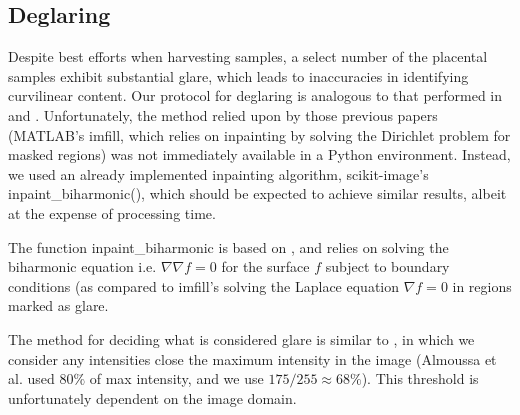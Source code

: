 %		
		
		    \subsection{Deglaring}
    
    Despite best efforts when harvesting samples, a select number of the placental samples exhibit substantial glare, which leads to inaccuracies in identifying curvilinear content. Our protocol for deglaring is analogous to that performed in \cite{almoussa-ucla-reu} and \cite{huynh2013filter}. Unfortunately, the method relied upon by those previous papers (\textrm{MATLAB}'s \textrm{imfill}, which relies on inpainting by solving the Dirichlet problem for masked regions) was not immediately available in a Python environment. Instead, we used an already implemented inpainting algorithm, \textrm{scikit-image}'s \textrm{inpaint\_biharmonic()}, which should be expected to achieve similar results, albeit at the expense of processing time.
    
    The function \textrm{inpaint\_biharmonic} is based on \cite{damelin2018surface}, and relies on solving the biharmonic equation i.e. $\nabla \nabla f = 0$
    for the surface $f$ subject to boundary conditions (as
    compared to \textrm{imfill}'s solving the Laplace equation $\nabla f = 0$ in regions marked as glare.
    
    The method for deciding what is considered glare is similar to \cite{almoussa-ucla-reu}, in which we
    consider any intensities close the maximum intensity in the image (Almoussa et al. used $80\%$ of max intensity, and we use $175/255 \approx 68\%$). This threshold is unfortunately dependent on the image domain.
    
